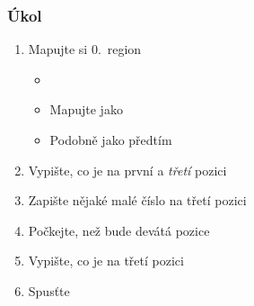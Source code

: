 \begin{frame}
  \frametitle{Úkol}

  \begin{enumerate}
    \item Mapujte si 0.\ region
    \begin{itemize}
      \item {}
      \item Mapujte jako 
      \item Podobně jako  předtím
    \end{itemize}

    \item Vypište, co je na první a \emph{třetí} pozici
    \item Zapište nějaké malé číslo na třetí pozici
    \item Počkejte, než bude devátá pozice 
    \item Vypište, co je na třetí pozici
    \item Spusťte
  \end{enumerate}

\end{frame}

